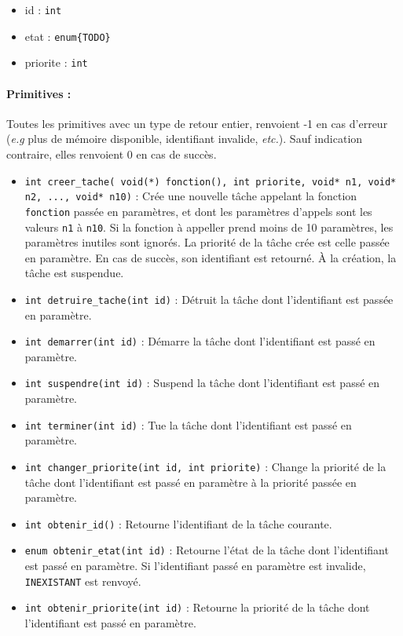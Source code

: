 {
	
}
{
\begin{itemize}
	\item id : \texttt{int}
	\item etat : \texttt{enum\{TODO\}} 
	\item priorite : \texttt{int} 
\end{itemize}
}
{
\paragraph{Primitives :}
Toutes les primitives avec un type de retour entier, renvoient -1 en cas d'erreur (\textsl{e.g} plus de mémoire disponible, identifiant invalide, \textsl{etc.}). Sauf indication contraire, elles renvoient 0 en cas de succès.

\begin{itemize}
	\item \texttt{int creer\_tache( void(*) fonction(), int priorite, void* n1, void* n2, ..., void* n10)} : Crée une nouvelle tâche appelant la fonction \texttt{fonction} passée en paramètres, et dont les paramètres d'appels sont les valeurs \texttt{n1} à \texttt{n10}. Si la fonction à appeller prend moins de 10 paramètres, les paramètres inutiles sont ignorés. La priorité de la tâche crée est celle passée en paramètre. En cas de succès, son identifiant est retourné. À la création, la tâche est suspendue.
	\item \texttt{int detruire\_tache(int id)} : Détruit la tâche dont l'identifiant est passée en paramètre.
	
	\item \texttt{int demarrer(int id)} : Démarre la tâche dont l'identifiant est passé en paramètre.
	\item \texttt{int suspendre(int id)} : Suspend la tâche dont l'identifiant est passé en paramètre. 
	\item \texttt{int terminer(int id)} : Tue la tâche dont l'identifiant est passé en paramètre.
	
	\item \texttt{int changer\_priorite(int id, int priorite)} : Change la priorité de la tâche dont l'identifiant est passé en paramètre à la priorité passée en paramètre.

	\item \texttt{int obtenir\_id()} : Retourne l'identifiant de la tâche courante.
	\item \texttt{enum obtenir\_etat(int id)} : Retourne l'état de la tâche dont l'identifiant est passé en paramètre. Si l'identifiant passé en paramètre est invalide, \texttt{INEXISTANT} est renvoyé.
	\item \texttt{int obtenir\_priorite(int id)} : Retourne la priorité de la tâche dont l'identifiant est passé en paramètre.
\end{itemize}
}
